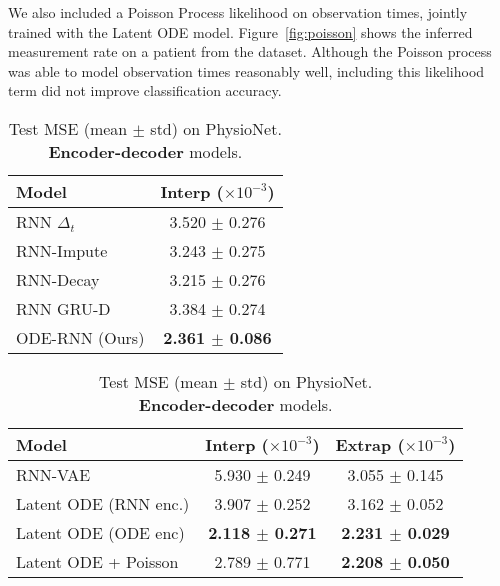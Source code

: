 \documentclass{article}
\begin{document}
We also included a Poisson Process likelihood on observation times, jointly trained with the Latent ODE model.
Figure~\ref{fig:poisson} shows the inferred measurement rate on a patient from the dataset.
Although the Poisson process was able to model observation times reasonably well, including this likelihood term did not improve classification accuracy.


\begin{table}
\parbox{0.36\linewidth}{
        \centering
        \captionsetup{justification=centering}
        \caption{Test MSE (mean $\pm$ std) on PhysioNet. \textbf{Autoregressive} models.}
    	\label{tab:phys_autoreg}
        \begin{tabular}{@{}lc@{}}
        \toprule
         Model & {\small Interp ($\times 10^{-3}$)}\\
        \midrule
        RNN $\Delta_t$ &   3.520 $\pm$ 0.276 \\
        RNN-Impute & 3.243 $\pm$ 0.275 \\
        RNN-Decay &  3.215 $\pm$ 0.276 \\
        RNN GRU-D & 3.384 $\pm$ 0.274 \\
        \addlinespace[2pt]
        \hdashline
        \addlinespace[2pt]
        ODE-RNN (Ours) & \textbf{2.361 $\pm$ 0.086} \\
        \bottomrule
        \end{tabular}
    }
    \hfill
    \parbox{0.6\linewidth}{ 
        \centering
        \captionsetup{justification=centering}
        \caption{Test MSE (mean $\pm$ std) on PhysioNet.\\\textbf{Encoder-decoder} models.}
    	\label{tab:phys_autoencoder}
        \begin{tabular}{@{}lcc@{}}
        \toprule
        Model & {\small Interp ($\times 10^{-3}$)} & {\small Extrap ($\times 10^{-3}$)}\\
        \midrule
        RNN-VAE & 5.930 $\pm$ 0.249 & 3.055 $\pm$ 0.145 \\
        Latent ODE (RNN enc.) & 3.907 $\pm$ 0.252 & 3.162 $\pm$ 0.052\\
        \addlinespace[2pt]
        \hdashline
        \addlinespace[2pt]
        Latent ODE (ODE enc) & \textbf{2.118 $\pm$ 0.271} & \textbf{2.231 $\pm$ 0.029} \\
        Latent ODE + Poisson & 2.789 $\pm$ 0.771 & \textbf{2.208 $\pm$ 0.050}\\
        \bottomrule
        \end{tabular}
    }
\end{table}
\end{document}

